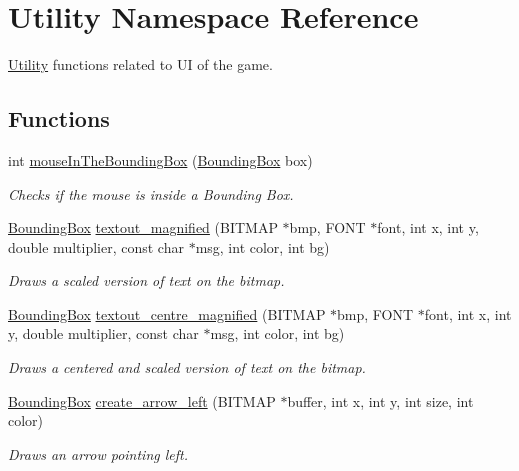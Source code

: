 \hypertarget{namespace_utility}{}\section{Utility Namespace Reference}
\label{namespace_utility}


\mbox{\hyperlink{namespace_utility}{Utility}} functions related to UI of the game.  


\subsection*{Functions}
\begin{DoxyCompactItemize}
\item 
int \mbox{\hyperlink{namespace_utility_abf218593a2688a7a97fcdd7a8ad33b18}{mouse\+In\+The\+Bounding\+Box}} (\mbox{\hyperlink{struct_bounding_box}{Bounding\+Box}} box)
\begin{DoxyCompactList}\small\item\em Checks if the mouse is inside a Bounding Box. \end{DoxyCompactList}\item 
\mbox{\hyperlink{struct_bounding_box}{Bounding\+Box}} \mbox{\hyperlink{namespace_utility_ae356e0fbb87662e2c6b20cab319cbed7}{textout\+\_\+magnified}} (B\+I\+T\+M\+AP $\ast$bmp, F\+O\+NT $\ast$font, int x, int y, double multiplier, const char $\ast$msg, int color, int bg)
\begin{DoxyCompactList}\small\item\em Draws a scaled version of text on the bitmap. \end{DoxyCompactList}\item 
\mbox{\hyperlink{struct_bounding_box}{Bounding\+Box}} \mbox{\hyperlink{namespace_utility_aa945341a76a7ea64a3e4a472a20c8d45}{textout\+\_\+centre\+\_\+magnified}} (B\+I\+T\+M\+AP $\ast$bmp, F\+O\+NT $\ast$font, int x, int y, double multiplier, const char $\ast$msg, int color, int bg)
\begin{DoxyCompactList}\small\item\em Draws a centered and scaled version of text on the bitmap. \end{DoxyCompactList}\item 
\mbox{\hyperlink{struct_bounding_box}{Bounding\+Box}} \mbox{\hyperlink{namespace_utility_ad1e2e7751248795478a0d207430bbd6c}{create\+\_\+arrow\+\_\+left}} (B\+I\+T\+M\+AP $\ast$buffer, int x, int y, int size, int color)
\begin{DoxyCompactList}\small\item\em Draws an arrow pointing left. \end{DoxyCompactList}\item 

\end{DoxyCompactItemize}
